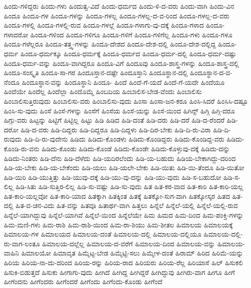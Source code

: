 {ಹಿಂದು-ಗಳಿದ್ದರು
ಹಿಂದು-ಗಳು
ಹಿಂದುತ್ವ-ವಿದೆ
ಹಿಂದು-ಧರ್ಮದ
ಹಿಂದು-ಳಿ-ದ-ವರು
ಹಿಂದು-ವಾಗಿ
ಹಿಂದು-ವಿನ
ಹಿಂದೂ
ಹಿಂದೂ-ಗಳ
ಹಿಂದೂ-ಗಳನ್ನು
ಹಿಂದೂ-ಗಳಲ್ಲ
ಹಿಂದೂ-ಗಳಲ್ಲ-ದ-ವ-ರಿಂದ
ಹಿಂದೂ-ಗಳಲ್ಲ-ದ-ವರು
ಹಿಂದೂ-ಗಳಲ್ಲಿ
ಹಿಂದೂ-ಗಳಲ್ಲಿ-ರುವ
ಹಿಂದೂ-ಗಳಲ್ಲೆ
ಹಿಂದೂ-ಗಳಾಗು-ವು-ದಕ್ಕೆ
ಹಿಂದೂ-ಗಳಾದ
ಹಿಂದೂ-ಗಳಾದರೋ
ಹಿಂದೂ-ಗಳಿಂದ
ಹಿಂದೂ-ಗಳಿಗೂ
ಹಿಂದೂ-ಗಳಿಗೆ
ಹಿಂದೂ-ಗಳಿಗೆಲ್ಲ
ಹಿಂದೂ-ಗಳು
ಹಿಂದೂ-ಗಳೂ
ಹಿಂದೂ-ಗಳೆಲ್ಲರೂ
ಹಿಂದೂ-ತತ್ತ್ವ-ಗಳನ್ನು
ಹಿಂದೂ-ದೇಶದ
ಹಿಂದೂ-ದೇಶ-ದಲ್ಲಿ
ಹಿಂದೂ-ದೇಶ-ದಲ್ಲಿದ್ದ
ಹಿಂದೂ-ಧರ್ಮ
ಹಿಂದೂ-ಧರ್ಮಕ್ಕೂ
ಹಿಂದೂ-ಧರ್ಮಕ್ಕೆ
ಹಿಂದೂ-ಧರ್ಮದ
ಹಿಂದೂ-ಧರ್ಮ-ದಲ್ಲಿ
ಹಿಂದೂ-ಧರ್ಮ-ದಷ್ಟು
ಹಿಂದೂ-ಧರ್ಮ-ವನ್ನು
ಹಿಂದೂ-ವಾಗಿದ್ದರೂ
ಹಿಂದೂ-ವಿಗೆ
ಹಿಂದೂವು
ಹಿಂದೂ-ಶಾಸ್ತ್ರ-ಗಳನ್ನು
ಹಿಂದೂ-ಶಾಸ್ತ್ರ-ದಲ್ಲಿ
ಹಿಂದೂ-ಸಂಸ್ಕೃತಿ
ಹಿಂದೂ-ಸಾ-ಗರ
ಹಿಂದೂಸ್ತಾನ-ದಷ್ಟೇ
ಹಿಂದೂಸ್ತಾನಿ
ಹಿಂದೂಸ್ಥಾನ-ದಲ್ಲಿ
ಹಿಂದೂಸ್ಥಾನ-ದ-ವ-ನೆಂದೂ
ಹಿಂದೂಸ್ಥಾನ-ವನ್ನು
ಹಿಂದೂಸ್ಥಾನಿ
ಹಿಂದೂ-
ಹಿಂದೆ
ಹಿಂದೆ-ಗೆ-ಯದೆ
ಹಿಂದೆ-ಗೆ-ಯದೇ
ಹಿಂದೆಯೂ
ಹಿಂದೆಯೇ
ಹಿಂದೆಲ್ಲ
ಹಿಂದೆಲ್ಲಾ
ಹಿಂದೊಮ್ಮೆ
ಹಿಂಬದಿಯ
ಹಿಂಬಾಲಿಸ-ಬೇಡ-ವೆಂದು
ಹಿಂಬಾಲಿಸು
ಹಿಂಬಾಲಿಸುತ್ತಿರುವುದು
ಹಿಂಬಾಲಿಸು-ವರು
ಹಿಂಬಾಲಿಸು-ವುದು
ಹಿಂಸಾ
ಹಿಂಸಾ-ಜನ-ಕರೂ
ಹಿಂಸಿ-ಸಿದರೆ
ಹಿಂಸಿಸಿ-ದಷ್ಟೂ
ಹಿಂಸಿ-ಸು-ವುದು
ಹಿಂಸೆ
ಹಿಂಸೆ-ಗಳನ್ನು
ಹಿಂಸೆಗೆ
ಹಿಂಸೆಯ
ಹಿಂಸೆ-ಯನ್ನು
ಹಿಂಸೆ-ಯಿಂದ
ಹಿಗಿನ್ಸ್
ಹಿಗ್ಗಿ
ಹಿಗ್ಗಿ-ದರೂ
ಹಿಗ್ಗು-ವರು
ಹಿಟ್ಟನ್ನು
ಹಿಟ್ಟಿಗೆ
ಹಿಟ್ಟಿಲ್ಲ
ಹಿಟ್ಟು
ಹಿಡಿ
ಹಿಡಿದ
ಹಿಡಿ-ದಂತೆ
ಹಿಡಿ-ದರು
ಹಿಡಿ-ದರೆ
ಹಿಡಿ-ದ-ರೆಂದರೆ
ಹಿಡಿ-ದರೋ
ಹಿಡಿ-ದ-ವರು
ಹಿಡಿ-ದಿದ್ದರು
ಹಿಡಿ-ದಿದ್ದರೂ
ಹಿಡಿ-ದಿದ್ದಳು
ಹಿಡಿ-ದಿರ-ಬೇಕು
ಹಿಡಿ-ದಿ-ರು-ವಿರಾ
ಹಿಡಿ-ದಿ-ರುವುದು
ಹಿಡಿ-ದಿ-ರು-ವುದೇನು
ಹಿಡಿದು
ಹಿಡಿದು-ಕೊಂಡಳು
ಹಿಡಿದು-ಕೊಂಡಿದ್ದರು
ಹಿಡಿದು-ಕೊಂಡಿದ್ದ-ವರು
ಹಿಡಿದು-ಕೊಂಡಿ-ರು-ವನು
ಹಿಡಿದು-ಕೊಂಡು
ಹಿಡಿದು-ಕೊಂಡೆ
ಹಿಡಿದು-ಕೊಂಡೇ
ಹಿಡಿದು-ಕೊಳ್ಳುವು-ದಕ್ಕೆ
ಹಿಡಿದು-ದನ್ನು
ಹಿಡಿದು-ನಿಂತರು
ಹಿಡಿ-ದೆನು
ಹಿಡಿ-ದೆಳೆದು
ಹಿಡಿ-ಯದಿರಲೆಂದು
ಹಿಡಿ-ಯ-ಬಹುದು
ಹಿಡಿಯ-ಬೇಕಾಗಿದ್ದು-ದರಿಂದ
ಹಿಡಿ-ಯ-ಬೇಕು
ಹಿಡಿ-ಯ-ಬೇಕೆಂದು
ಹಿಡಿ-ಯಲು
ಹಿಡಿ-ಯಲೇ-ಬೇಕು
ಹಿಡಿ-ಯಿತು
ಹಿಡಿ-ಯಿ-ತೆಂದೂ
ಹಿಡಿ-ಯಿತೋ
ಹಿಡಿ-ಯಿರಿ
ಹಿಡಿ-ಯುತ್ತಿತ್ತು
ಹಿಡಿ-ಯುವು-ದಕ್ಕೆ
ಹಿಡಿ-ಯು-ವು-ದನ್ನು
ಹಿಡಿ-ಯು-ವುದು
ಹಿಡಿ-ಸ-ಬಹುದೋ
ಹಿಡಿ-ಸ-ಲಿಲ್ಲ
ಹಿಡಿ-ಸಿತು
ಹಿಡಿ-ಸುತ್ತಿರ-ಲಿಲ್ಲ
ಹಿಡಿ-ಸು-ವಷ್ಟು
ಹಿಡಿ-ಸು-ವುದು
ಹಿತ
ಹಿತ-ಕರ-ವಾದ
ಹಿತ-ಕಾರಿ
ಹಿತ-ಕಾರಿ-ಯಲ್ಲ
ಹಿತ-ಕಾರಿ-ಯಲ್ಲವೋ
ಹಿತ-ಕಾರಿ-ಯಾದ
ಹಿತಕ್ಕಾಗಿ
ಹಿತಕ್ಕಿಂತ
ಹಿತಕ್ಕೆ
ಹಿತಕ್ಕೋ-ಸುಗ-ವಾಗಿ
ಹಿತಕ್ಕೋಸ್ಕರ
ಹಿತದ
ಹಿತ-ದಲ್ಲಿ
ಹಿತ-ವ-ಚನ-ವಿದು
ಹಿತ-ವನ್ನು
ಹಿತವೂ
ಹಿತಾರ್ಥ-ವಾಗಿ
ಹಿತ್ತಲು
ಹಿನ್ನೆಲೆ
ಹಿನ್ನೆಲೆ-ಯಲ್ಲಿ
ಹಿನ್ನೆಲೆ-ಯಲ್ಲಿ-ರುವ
ಹಿನ್ನೆಲೆ-ಯಾಗಿದ್ದುವು
ಹಿನ್ನೆಲೆ-ಯಾಗಿವೆ
ಹಿನ್ನೆಲೆ-ಯಿಂದ
ಹಿನ್ನೆಲೆಯೇ
ಹಿಮ
ಹಿಮದ
ಹಿಮ-ದಿಂದ
ಹಿಮ-ಪಂಕ್ತಿ-ಗಳನ್ನು
ಹಿಮ-ಮಣಿ-ಗಳು
ಹಿಮ-ರಾಶಿ
ಹಿಮ-ರಾಶಿ-ಯಿಂದ
ಹಿಮ-ರಾ-ಶಿಯು
ಹಿಮ-ಶೀತಲ
ಹಿಮಾಲಯ
ಹಿಮಾಲಯಕ್ಕೆ
ಹಿಮಾಲಯ-ಗಳ
ಹಿಮಾಲಯದ
ಹಿಮಾಲಯ-ದಂತೆ
ಹಿಮಾಲಯ-ದಲ್ಲಿ
ಹಿಮಾಲಯ-ದಲ್ಲಿಯೂ
ಹಿಮಾಲಯ-ದಲ್ಲಿ-ರು-ವಾಗ-ಲಂತೂ
ಹಿಮಾಲಯ-ದಲ್ಲೆಲ್ಲ
ಹಿಮಾಲಯ-ದ-ವರೆಗೆ
ಹಿಮಾಲಯ-ದಿಂದ
ಹಿಮಾಲಯ-ವನ್ನು
ಹಿಮಾಲಯ-ವಾಹಿನಿ
ಹಿಮಾಲಯೋ
ಹಿಮಾವೃತ
ಹಿಮ್ಮೆಟ್ಟ-ಬೇಡ
ಹಿಮ್ಮೆಟ್ಟಿ-ಸಲು
ಹಿಮ್ಮೇಳ-ದಂತೆ
ಹಿರಾಮ್
ಹಿರಿದ
ಹಿರಿಮೆ-ಯನ್ನು
ಹಿರಿಯ
ಹಿರಿಯ-ನಾ-ದು-ದರಿಂದ
ಹಿರಿಯ-ರನ್ನು
ಹಿರಿಯ-ರಾದ
ಹಿರಿಯರು
ಹಿರಿಯ-ರೆಲ್ಲ
ಹಿರಿಯಾಸೆ
ಹಿಲ್
ಹಿಸುಕಲಿ
ಹಿಸುಕಿ-ಬಿಡುತ್ತದೆ
ಹಿಸುಕು
ಹೀಗಾಗು-ವುದು
ಹೀಗಿದೆ
ಹೀಗಿದ್ದ
ಹೀಗಿದ್ದರೆ
ಹೀಗಿದ್ದುವು
ಹೀಗಿರು-ವಾಗ
ಹೀಗೂ
ಹೀಗೆ
ಹೀಗೆಂದನು
ಹೀಗೆಂದರು
ಹೀಗೆಂದರೆ
ಹೀಗೆಂದು
ಹೀಗೆಂದು-ಕೊಂಡು
ಹೀಗೆಂದೆ
}
